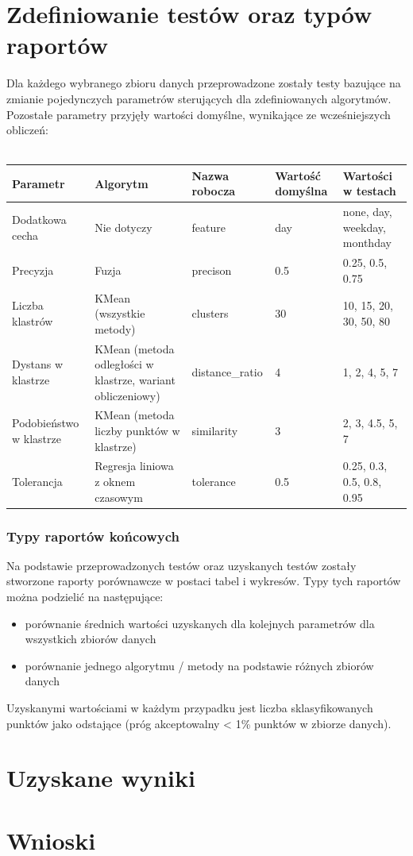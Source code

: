 \documentclass[eng,printmode]{mgr}
\begin{document}
\section{Zdefiniowanie testów oraz typów raportów}
Dla każdego wybranego zbioru danych przeprowadzone zostały testy bazujące na zmianie pojedynczych parametrów sterujących dla zdefiniowanych algorytmów. Pozostałe parametry przyjęły wartości domyślne, wynikające ze wcześniejszych obliczeń:
\\\\
\begingroup
\fontsize{10pt}{12pt}\selectfont

\begin{tabu} to 0.9\textwidth { | X[l] | X[l] | X[l] | X[l] | X[l] |}
\hline
\textbf{Parametr} & \textbf{Algorytm} & \textbf{Nazwa robocza} & \textbf{Wartość domyślna} & \textbf{Wartości w testach}\\
\hline
Dodatkowa cecha & Nie dotyczy & feature & day & none, day, weekday, monthday \\
\hline
Precyzja & Fuzja & precison &  0.5 & 0.25, 0.5, 0.75 \\
\hline
Liczba klastrów & KMean (wszystkie metody) & clusters & 30 & 10, 15, 20, 30, 50, 80\\
\hline
Dystans w klastrze & KMean (metoda odległości w klastrze, wariant obliczeniowy) & distance\_ratio & 4 & 1, 2, 4, 5, 7\\
\hline
Podobieństwo w klastrze & KMean (metoda liczby punktów w klastrze) & similarity & 3 & 2, 3, 4.5, 5, 7\\
\hline
Tolerancja & Regresja liniowa z oknem czasowym & tolerance & 0.5 & 0.25, 0.3, 0.5, 0.8, 0.95\\
\hline
\end{tabu}
\endgroup

\subsubsection{Typy raportów końcowych}
Na podstawie przeprowadzonych testów oraz uzyskanych testów zostały stworzone raporty porównawcze w postaci tabel i wykresów. Typy tych raportów można podzielić na następujące:
\begin{itemize}
  \item porównanie średnich wartości uzyskanych dla kolejnych parametrów dla wszystkich zbiorów danych
  \item porównanie jednego algorytmu / metody na podstawie różnych zbiorów danych
\end{itemize}

Uzyskanymi wartościami w każdym przypadku jest liczba sklasyfikowanych punktów jako odstające (próg akceptowalny < 1\% punktów w zbiorze danych).


\section{Uzyskane wyniki}
\section{Wnioski}



\end{document}

